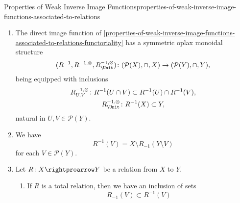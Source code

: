 \begin{proposition}{Properties of Weak Inverse Image Functions}{properties-of-weak-inverse-image-functions-associated-to-relations}
\begin{enumerate}
\[\begin{gathered}
                    R^{-1,\otimes}_{U,V}   \colon R^{-1}(U)\cup R^{-1}(V) \rightequalsarrow R^{-1}(U\cup V),\\
                    R^{-1,\otimes}_{\Unit} \colon \emptyset               \rightequalsarrow \emptyset,
                \end{gathered}
            \]%
            natural in $U,V\in\mathcal{P}(Y)$.
        \item\label{properties-of-weak-inverse-image-functions-associated-to-relations-symmetric-oplax-monoidality-with-respect-to-intersections}The direct image function of \cref{properties-of-weak-inverse-image-functions-associated-to-relations-functoriality} has a symmetric oplax monoidal structure
            \[
                (R^{-1},R^{-1,\otimes},R^{-1,\otimes}_{\Unit})
                \colon
                (\mathcal{P}(X),\cap,X)
                \to
                (\mathcal{P}(Y),\cap,Y),
            \]%
            being equipped with inclusions%
            \[
                \begin{gathered}
                    R^{-1,\otimes}_{U,V}   \colon R^{-1}(U\cap V) \subset R^{-1}(U)\cap R^{-1}(V),\\
                    R^{-1,\otimes}_{\Unit} \colon R^{-1}(X)       \subset Y,
                \end{gathered}
            \]%
            natural in $U,V\in\mathcal{P}(Y)$.
        \item\label{properties-of-weak-inverse-image-functions-associated-to-relations-interaction-with-strong-inverse-images-1}We have
            \[
                R^{-1}(V)%
                =%
                X\setminus R_{-1}(Y\setminus V)
            \]%
            for each $V\in\mathcal{P}(Y)$.
        \item\label{properties-of-weak-inverse-image-functions-associated-to-relations-interaction-with-strong-inverse-images-2}Let $R\colon X\rightproarrow Y$ be a relation from $X$ to $Y$.
            \begin{enumerate}
                \item\label{properties-of-weak-inverse-image-functions-associated-to-relations-interaction-with-strong-inverse-images-2-a}If $R$ is a total relation, then we have an inclusion of sets
                    \[
                        R_{-1}(V)
                        \subset
                        R^{-1}(V)
\]
\end{enumerate}
\end{enumerate}
\end{proposition}
